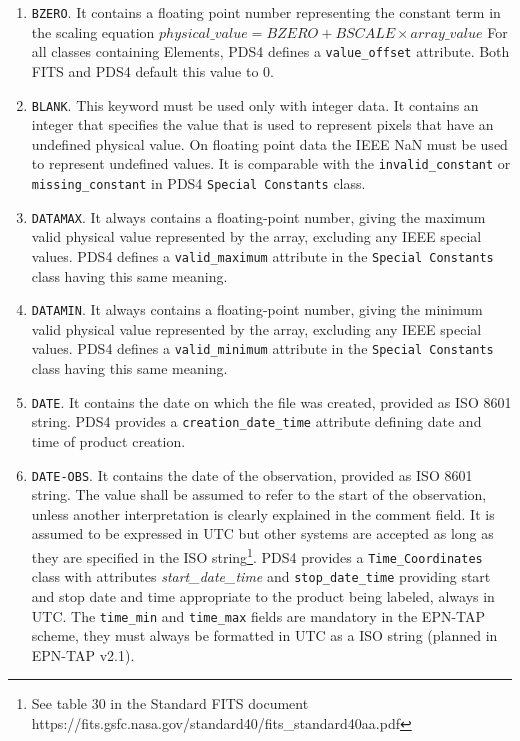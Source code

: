 \begin{enumerate}
\item{\texttt{BZERO}.
It contains a floating point number representing the constant term in the
scaling equation $physical\_value = BZERO + BSCALE \times array\_value$
For all classes containing Elements, PDS4 defines a \texttt{value\_offset}
attribute. Both FITS and PDS4 default this value to $0$.}

\item{\texttt{BLANK}.
This keyword must be used only with integer data.
It contains an integer that specifies the value that is used to
represent pixels that have an undefined physical value.
On floating point data the IEEE NaN must be used to represent undefined values.  
It is comparable with the \texttt{invalid\_constant} or \texttt{missing\_constant}
in PDS4 \texttt{Special Constants} class.}

\item{\texttt{DATAMAX}.
It always contains a floating-point number, giving the maximum valid physical value
represented by the array, excluding any IEEE special values.
PDS4 defines a \texttt{valid\_maximum} attribute in the \texttt{Special Constants} class
having this same meaning.}

\item{\texttt{DATAMIN}.
It always contains a floating-point number, giving the minimum valid physical value
represented by the array, excluding any IEEE special values.
PDS4 defines a \texttt{valid\_minimum} attribute in the \texttt{Special Constants} class
having this same meaning.}

\item{\texttt{DATE}.
It contains the date on which the file was created, provided as ISO 8601
string.
PDS4 provides a \texttt{creation\_date\_time} attribute defining date
and time of product creation.}

\item{\texttt{DATE-OBS}.
It contains the date of the observation, provided as ISO 8601
string. The value shall be assumed to refer to the start of the observation,
unless another interpretation is clearly explained in the comment field.
It is assumed to be expressed in UTC but other systems are accepted as long as they
are specified in the ISO string\footnote{See table 30 in the Standard FITS document https://fits.gsfc.nasa.gov/standard40/fits\_standard40aa.pdf}. 
PDS4 provides a \texttt{Time\_Coordinates} class with attributes
\textit{start\_date\_time} and \texttt{stop\_date\_time} providing start and
stop date and time appropriate to the product being labeled, always in UTC.
The \texttt{time\_min} and \texttt{time\_max} fields are mandatory in the EPN-TAP
scheme, they must always be formatted in UTC as a ISO string (planned in EPN-TAP v2.1).}


\end{enumerate}
